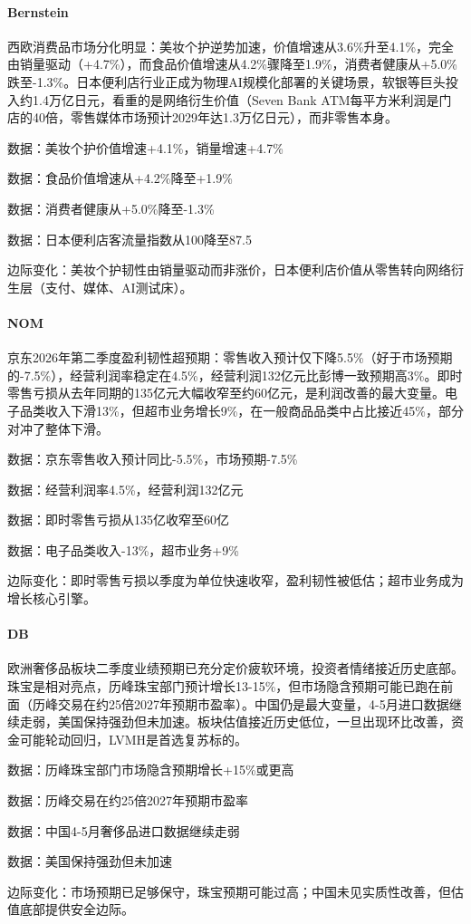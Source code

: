 \documentclass[11pt]{ctexart}
\begin{document}
\paragraph{Bernstein} 西欧消费品市场分化明显：美妆个护逆势加速，价值增速从3.6\%升至4.1\%，完全由销量驱动（+4.7\%），而食品价值增速从4.2\%骤降至1.9\%，消费者健康从+5.0\%跌至-1.3\%。日本便利店行业正成为物理AI规模化部署的关键场景，软银等巨头投入约1.4万亿日元，看重的是网络衍生价值（Seven Bank ATM每平方米利润是门店的40倍，零售媒体市场预计2029年达1.3万亿日元），而非零售本身。
{\small\color{refgray}数据：美妆个护价值增速+4.1\%，销量增速+4.7\%\par}
{\small\color{refgray}数据：食品价值增速从+4.2\%降至+1.9\%\par}
{\small\color{refgray}数据：消费者健康从+5.0\%降至-1.3\%\par}
{\small\color{refgray}数据：日本便利店客流量指数从100降至87.5\par}
{\small\color{refgray}边际变化：美妆个护韧性由销量驱动而非涨价，日本便利店价值从零售转向网络衍生层（支付、媒体、AI测试床）。\par}
\paragraph{NOM} 京东2026年第二季度盈利韧性超预期：零售收入预计仅下降5.5\%（好于市场预期的-7.5\%），经营利润率稳定在4.5\%，经营利润132亿元比彭博一致预期高3\%。即时零售亏损从去年同期的135亿元大幅收窄至约60亿元，是利润改善的最大变量。电子品类收入下滑13\%，但超市业务增长9\%，在一般商品品类中占比接近45\%，部分对冲了整体下滑。
{\small\color{refgray}数据：京东零售收入预计同比-5.5\%，市场预期-7.5\%\par}
{\small\color{refgray}数据：经营利润率4.5\%，经营利润132亿元\par}
{\small\color{refgray}数据：即时零售亏损从135亿收窄至60亿\par}
{\small\color{refgray}数据：电子品类收入-13\%，超市业务+9\%\par}
{\small\color{refgray}边际变化：即时零售亏损以季度为单位快速收窄，盈利韧性被低估；超市业务成为增长核心引擎。\par}
\paragraph{DB} 欧洲奢侈品板块二季度业绩预期已充分定价疲软环境，投资者情绪接近历史底部。珠宝是相对亮点，历峰珠宝部门预计增长13-15\%，但市场隐含预期可能已跑在前面（历峰交易在约25倍2027年预期市盈率）。中国仍是最大变量，4-5月进口数据继续走弱，美国保持强劲但未加速。板块估值接近历史低位，一旦出现环比改善，资金可能轮动回归，LVMH是首选复苏标的。
{\small\color{refgray}数据：历峰珠宝部门市场隐含预期增长+15\%或更高\par}
{\small\color{refgray}数据：历峰交易在约25倍2027年预期市盈率\par}
{\small\color{refgray}数据：中国4-5月奢侈品进口数据继续走弱\par}
{\small\color{refgray}数据：美国保持强劲但未加速\par}
{\small\color{refgray}边际变化：市场预期已足够保守，珠宝预期可能过高；中国未见实质性改善，但估值底部提供安全边际。\par}
\end{document}
